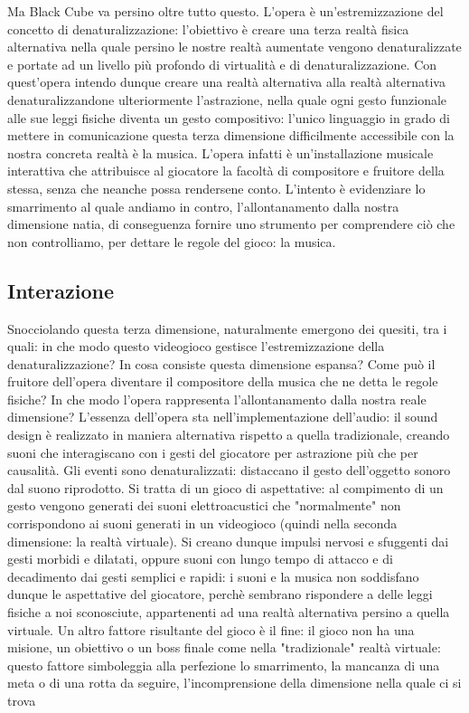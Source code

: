 	Ma Black Cube va persino oltre tutto questo. L'opera è un'estremizzazione del concetto di denaturalizzazione: l'obiettivo è creare una terza realtà fisica alternativa nella quale persino le nostre realtà aumentate vengono denaturalizzate e portate ad un livello più profondo di virtualità e di denaturalizzazione.
	Con quest'opera intendo dunque creare una realtà alternativa alla realtà alternativa denaturalizzandone ulteriormente l'astrazione, nella quale ogni gesto funzionale alle sue leggi fisiche diventa un gesto compositivo: l'unico linguaggio in grado di mettere in comunicazione questa terza dimensione difficilmente accessibile con la nostra concreta realtà è la musica.
	L'opera infatti è un'installazione musicale interattiva che attribuisce al giocatore la facoltà di compositore e fruitore della stessa, senza che neanche possa rendersene conto.
	L'intento è evidenziare lo smarrimento al quale andiamo in contro, l'allontanamento dalla nostra dimensione natia, di conseguenza fornire uno strumento per comprendere ciò che non controlliamo, per dettare le regole del gioco: la musica.
	
	\subsection{Interazione}
	Snocciolando questa terza dimensione, naturalmente emergono dei quesiti, tra i quali: in che modo questo videogioco gestisce l'estremizzazione della denaturalizzazione? In cosa consiste questa dimensione espansa? Come può il fruitore dell'opera diventare il compositore della musica che ne detta le regole fisiche? In che modo  l'opera rappresenta l'allontanamento dalla nostra reale dimensione?
	L'essenza dell'opera sta nell'implementazione dell'audio: il sound design è realizzato in maniera alternativa rispetto a quella tradizionale, creando suoni che interagiscano con i gesti del giocatore per astrazione più che per causalità. Gli eventi sono denaturalizzati: distaccano il gesto dell'oggetto sonoro dal suono riprodotto.
	Si tratta di un gioco di aspettative: al compimento di un gesto vengono generati dei suoni elettroacustici che "normalmente" non corrispondono ai suoni generati in un videogioco (quindi nella seconda dimensione: la realtà virtuale). Si creano dunque impulsi nervosi e sfuggenti dai gesti morbidi e dilatati, oppure suoni con lungo tempo di attacco e di decadimento dai gesti semplici e rapidi: i suoni e la musica non soddisfano dunque le aspettative del giocatore, perchè sembrano rispondere a delle leggi fisiche a noi sconosciute, appartenenti ad una realtà alternativa persino a quella virtuale.
	Un altro fattore risultante del gioco è il fine: il gioco non ha una misione, un obiettivo o un boss finale come nella "tradizionale" realtà virtuale: questo fattore simboleggia alla perfezione lo smarrimento, la mancanza di una meta o di una rotta da seguire, l'incomprensione della dimensione nella quale ci si trova
	
